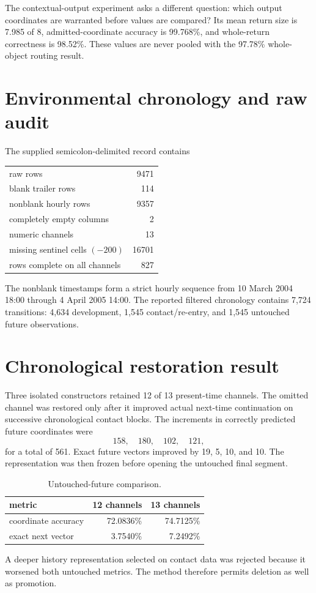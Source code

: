 \documentclass[11pt,a4paper]{article}
\begin{document}
The contextual-output experiment asks a different question: which output coordinates are warranted before values are compared? Its mean return size is 7.985 of 8, admitted-coordinate accuracy is 99.768\%, and whole-return correctness is 98.52\%. These values are never pooled with the 97.78\% whole-object routing result.

\section{Environmental chronology and raw audit}
The supplied semicolon-delimited record contains
\begin{center}
\begin{tabular}{lr}
\toprule
raw rows&9471\\
blank trailer rows&114\\
nonblank hourly rows&9357\\
completely empty columns&2\\
numeric channels&13\\
missing sentinel cells $(-200)$&16701\\
rows complete on all channels&827\\
\bottomrule
\end{tabular}
\end{center}
The nonblank timestamps form a strict hourly sequence from 10 March 2004 18:00 through 4 April 2005 14:00. The reported filtered chronology contains 7,724 transitions: 4,634 development, 1,545 contact/re-entry, and 1,545 untouched future observations.

\section{Chronological restoration result}
Three isolated constructors retained 12 of 13 present-time channels. The omitted channel was restored only after it improved actual next-time continuation on successive chronological contact blocks. The increments in correctly predicted future coordinates were
\begin{equation}
158,\quad180,\quad102,\quad121,
\end{equation}
for a total of 561. Exact future vectors improved by 19, 5, 10, and 10. The representation was then frozen before opening the untouched final segment.

\begin{table}[H]\centering
\caption{Untouched-future comparison.}
\begin{tabular}{lrr}
\toprule
metric&12 channels&13 channels\\\midrule
coordinate accuracy&72.0836\%&74.7125\%\\
exact next vector&3.7540\%&7.2492\%\\
\bottomrule
\end{tabular}
\end{table}
A deeper history representation selected on contact data was rejected because it worsened both untouched metrics. The method therefore permits deletion as well as promotion.
\end{document}
